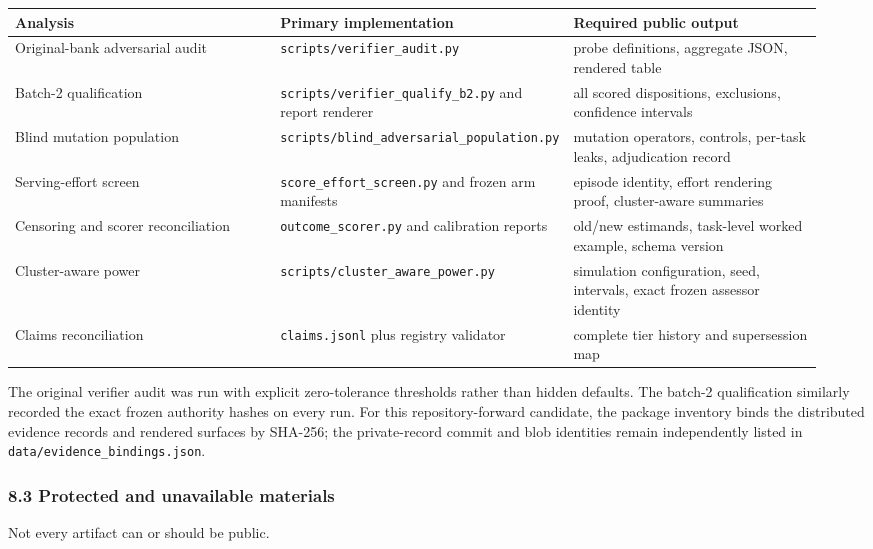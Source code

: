 \documentclass[
]{article}
\newcounter{none} %
\begin{document}
{\def\LTcaptype{none} %
\begin{longtable}[]{@{}p{0.34\linewidth}p{0.28\linewidth}p{0.32\linewidth}@{}}
\toprule\noalign{}
Analysis & Primary implementation & Required public output \\
\midrule\noalign{}
\endhead
\bottomrule\noalign{}
\endlastfoot
Original-bank adversarial audit & \texttt{scripts/verifier\_audit.py} &
probe definitions, aggregate JSON, rendered table \\
Batch-2 qualification & \texttt{scripts/verifier\_qualify\_b2.py} and
report renderer & all scored dispositions, exclusions, confidence
intervals \\
Blind mutation population &
\texttt{scripts/blind\_adversarial\_population.py} & mutation operators,
controls, per-task leaks, adjudication record \\
Serving-effort screen & \texttt{score\_effort\_screen.py} and frozen arm
manifests & episode identity, effort rendering proof, cluster-aware
summaries \\
Censoring and scorer reconciliation & \texttt{outcome\_scorer.py} and
calibration reports & old/new estimands, task-level worked example,
schema version \\
Cluster-aware power & \texttt{scripts/cluster\_aware\_power.py} &
simulation configuration, seed, intervals, exact frozen assessor
identity \\
Claims reconciliation & \texttt{claims.jsonl} plus registry validator &
complete tier history and supersession map \\
\end{longtable}
}

The original verifier audit was run with explicit zero-tolerance
thresholds rather than hidden defaults. The batch-2 qualification
similarly recorded the exact frozen authority hashes on every run. For
this repository-forward candidate, the package inventory binds the
distributed evidence records and rendered surfaces by SHA-256; the
private-record commit and blob identities remain independently listed in
\texttt{data/evidence\_bindings.json}.

\subsubsection{8.3 Protected and unavailable
materials}\label{83-protected-and-unavailable-materials}

Not every artifact can or should be public.
\end{document}

